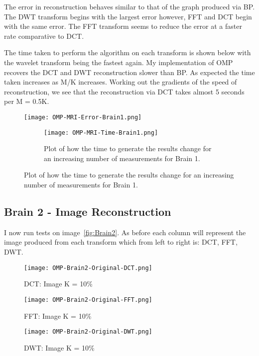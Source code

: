 \documentclass[titlepage,oneside, 12pt]{book}
\theoremstyle{break}
\begin{document}
The error in reconstruction behaves similar to that of the graph produced via BP. The DWT transform begins with the largest error however, FFT and DCT begin with the same error. The FFT transform seems to reduce the error at a faster rate comparative to DCT.   

The time taken to perform the algorithm on each transform is shown below with the wavelet transform being the fastest again. My implementation of OMP recovers the DCT and DWT reconstruction slower than BP. As expected the time taken increases as M/K increases. Working out the gradients of the speed of reconstruction, we see that the reconstruction via DCT takes almost 5 seconds per M = 0.5K. 

\begin{figure}[H]
\centering
\centerline{\texttt{[image: OMP-MRI-Error-Brain1.png]}}
\caption{Plot of how the error valueschange for an increasing number of measurements for Brain 1.}
\label{fig:OMP-MRI-Error-Brain1}

\begin{figure}[H]
\centering
\centerline{\texttt{[image: OMP-MRI-Time-Brain1.png]}}
\caption{Plot of how the time to generate the results change for an increasing number of measurements for Brain 1.}
\label{fig:OMP-MRI-Time-Brain1}
\end{figure}
\end{figure}



\clearpage


\subsection{Brain 2 - Image Reconstruction}

I now run tests on image~\ref{fig:Brain2}. As before each column will represent the image produced from each transform which from left to right is: DCT, FFT, DWT. 

\begin{figure}[!h]
\centering
{}
  \texttt{[image: OMP-Brain2-Original-DCT.png]}
  \caption{DCT: Image K = 10\%}\label{fig:OMP-Brain2-Original-DCT}
\endminipage
\hspace*{2em}
  \texttt{[image: OMP-Brain2-Original-FFT.png]}
  \caption{FFT: Image K = 10\%}\label{fig:OMP-Brain2-Original-FFT}
\endminipage
\hspace*{2em}
%
  \texttt{[image: OMP-Brain2-Original-DWT.png]}
  \caption{DWT: Image K = 10\%}\label{fig:OMP-Brain2-Original-DWT}
\endminipage
\hspace*{2em}
\end{figure}
\end{document}

